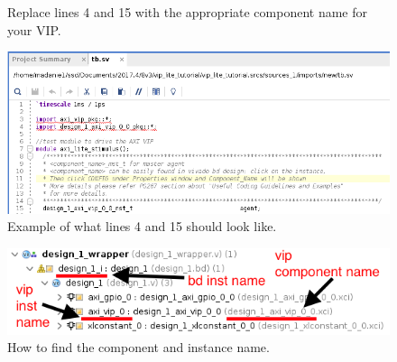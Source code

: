 \documentclass[12pt]{article}
\begin{document}
\begin{enumerate}
\begin{figure}[H]
		  \caption{Replace lines 4 and 15 with the appropriate component name for your VIP.}
		  \label{fig:componentname1}
		\end{figure}
		\begin{figure}[H]
		  \centering
		  \includegraphics[scale=0.5]{componentname2.png}
		  \caption{Example of what lines 4 and 15 should look like.}
		  \label{fig:componentname2}
		\end{figure}
		\begin{figure}[H]
		  \centering
		  \includegraphics[scale=0.5]{filehierarchy2.png}
		  \caption{How to find the component and instance name.}
		  \label{fig:findnames}
		\end{figure}
		

\end{enumerate}
\end{document}
